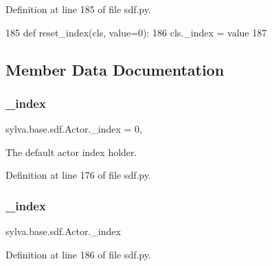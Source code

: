 Definition at line 185 of file sdf.\+py.


\begin{DoxyCode}
185     \textcolor{keyword}{def }reset\_index(cls, value=0):
186         cls.\_index = value
187 
\end{DoxyCode}


\subsection{Member Data Documentation}
\mbox{\label{classsylva_1_1base_1_1sdf_1_1_actor_a2b486ccde6c94e6bfdaa15b04ffe0da4}} 
\subsubsection{\texorpdfstring{\+\_\+index}{\_index}\hspace{0.1cm}{\footnotesize\ttfamily [1/2]}}
{\footnotesize\ttfamily sylva.\+base.\+sdf.\+Actor.\+\_\+index = 0\hspace{0.3cm}{\ttfamily [static]}, {\ttfamily [private]}}



The default actor index holder. 



Definition at line 176 of file sdf.\+py.

\mbox{\label{classsylva_1_1base_1_1sdf_1_1_actor_a2b486ccde6c94e6bfdaa15b04ffe0da4}} 
\subsubsection{\texorpdfstring{\+\_\+index}{\_index}\hspace{0.1cm}{\footnotesize\ttfamily [2/2]}}
{\footnotesize\ttfamily sylva.\+base.\+sdf.\+Actor.\+\_\+index\hspace{0.3cm}{\ttfamily [private]}}



Definition at line 186 of file sdf.\+py.

